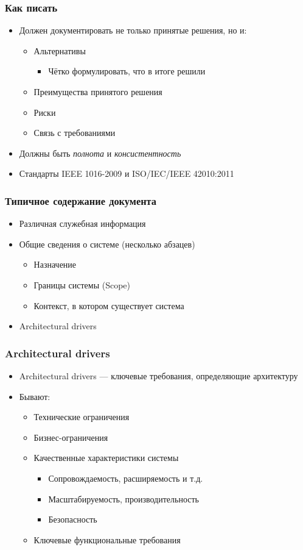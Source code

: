 \documentclass[xetex,mathserif,serif]{beamer}
\begin{document}
	\begin{frame}
		\frametitle{Как писать}
		\begin{itemize}
			\item Должен документировать не только принятые решения, но и:
			\begin{itemize}
				\item Альтернативы
				\begin{itemize}
					\item Чётко формулировать, что в итоге решили
				\end{itemize}
				\item Преимущества принятого решения
				\item Риски
				\item Связь с требованиями
			\end{itemize}
			\item Должны быть \textit{полнота} и \textit{консистентность}
			\item Стандарты IEEE 1016-2009 и ISO/IEC/IEEE 42010:2011
		\end{itemize}
	\end{frame}

	\begin{frame}
		\frametitle{Типичное содержание документа}
		\begin{itemize}
			\item Различная служебная информация
			\item Общие сведения о системе (несколько абзацев)
			\begin{itemize}
				\item Назначение
				\item Границы системы (Scope)
				\item Контекст, в котором существует система
			\end{itemize}
			\item Architectural drivers
		\end{itemize}
	\end{frame}

	\begin{frame}
		\frametitle{Architectural drivers}
		\begin{itemize}
			\item Architectural drivers --- ключевые требования, определяющие архитектуру
			\item Бывают:
			\begin{itemize}
				\item Технические ограничения
				\item Бизнес-ограничения
				\item Качественные характеристики системы
				\begin{itemize}
					\item Сопровождаемость, расширяемость и т.д.
					\item Масштабируемость, производительность
					\item Безопасность
				\end{itemize}
				\item Ключевые функциональные требования
			\end{itemize}
		\end{itemize}
	\end{frame}
\end{document}

